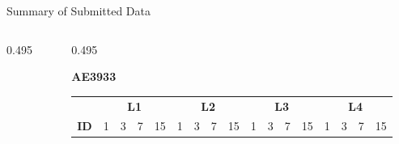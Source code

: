 \begin{frame}{\small  Summary of Submitted Data}
\begin{columns}[T,onlytextwidth]
\begin{column}{0.495\textwidth}
\end{column}


\begin{column}{0.495\textwidth}
\centering

\textbf{AE3933}

\vspace{0.05cm}

\renewcommand{\arraystretch}{1.10}
\setlength{\tabcolsep}{1.05pt}

\begin{tabular}{c|cccc|cccc|cccc|cccc}
\toprule
&
\multicolumn{4}{c|}{\textbf{L1}} &
\multicolumn{4}{c|}{\textbf{L2}} &
\multicolumn{4}{c|}{\textbf{L3}} &
\multicolumn{4}{c}{\textbf{L4}} \\

\textbf{ID}
& 1 & 3 & 7 & 15
& 1 & 3 & 7 & 15
& 1 & 3 & 7 & 15
& 1 & 3 & 7 & 15 \\
\midrule


\end{tabular}
\end{column}
\end{columns}
\end{frame}

